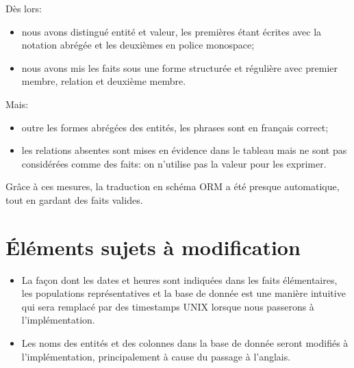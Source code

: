 \documentclass[a4paper,10pt]{article}
\begin{document}
Dès lors:
\begin{itemize}
    \item nous avons distingué entité et valeur, les premières étant écrites avec la notation abrégée et les deuxièmes en police monospace;
    \item nous avons mis les faits sous une forme structurée et régulière avec premier membre, relation et deuxième membre.
\end{itemize}

Mais:
\begin{itemize}
    \item outre les formes abrégées des entités, les phrases sont en français correct;
    \item les relations absentes sont mises en évidence dans le tableau mais ne sont pas considérées comme des faits: on n'utilise pas la valeur  pour les exprimer.
\end{itemize}

Grâce à ces mesures, la traduction en schéma ORM a été presque automatique, tout en gardant des faits valides.

\section{Éléments sujets à modification}

\begin{itemize}
    \item La façon dont les dates et heures sont indiquées dans les faits élémentaires, les populations représentatives et la base de donnée est une manière intuitive qui sera remplacé par des timestamps UNIX lorsque nous passerons à l'implémentation.
    \item Les noms des entités et des colonnes dans la base de donnée seront modifiés à l'implémentation, principalement à cause du passage à l'anglais.
\end{itemize}
\end{document}
